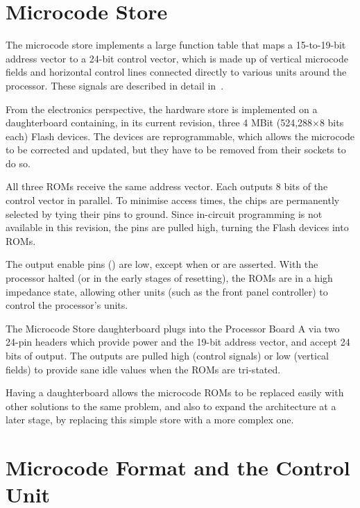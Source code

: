 \section{Microcode Store}
\label{sec:microcode-store}


The microcode store implements a large function table that maps a 15-to-19-bit
address vector to a 24-bit control vector, which is made up of vertical
microcode fields and horizontal control lines connected directly to various
units around the processor. These signals are described in detail
in~.

From the electronics perspective, the hardware store is implemented on a
daughterboard containing, in its current revision, three 4 MBit (524,288×8 bits
each) Flash devices. The devices are reprogrammable, which allows the microcode
to be corrected and updated, but they have to be removed from their sockets to
do so.

All three ROMs receive the same address vector. Each outputs 8 bits of the
control vector in parallel. To minimise access times, the chips are permanently
selected by tying their  pins to ground. Since in-circuit programming is
not available in this revision, the  pins are pulled high, turning the
Flash devices into ROMs.

The output enable pins () are low, except when  or 
are asserted. With the processor halted (or in the early stages of resetting),
the ROMs are in a high impedance state, allowing other units (such as the front
panel controller) to control the processor's units.

The Microcode Store daughterboard plugs into the Processor Board A via two
24-pin headers which provide power and the 19-bit address vector, and accept 24
bits of output. The outputs are pulled high (control signals) or low (vertical
fields) to provide sane idle values when the ROMs are tri-stated.

Having a daughterboard allows the microcode ROMs to be replaced easily with
other solutions to the same problem, and also to expand the architecture at a
later stage, by replacing this simple store with a more complex one.

\section{Microcode Format and the Control Unit}
\label{sec:microcode-format}

